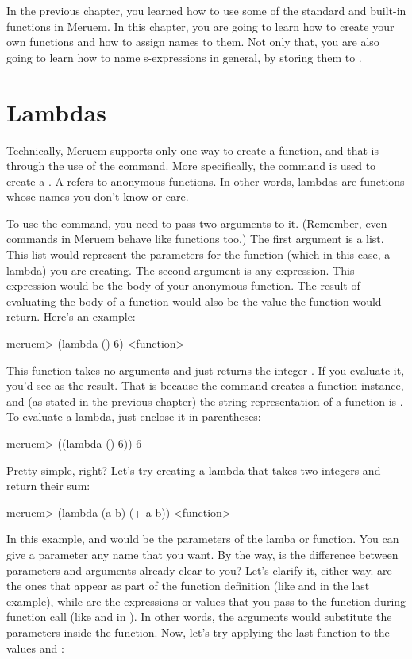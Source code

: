In the previous chapter, you learned how to use some of the standard and built-in functions in Meruem. In this chapter, you are going to learn how to create your own functions and how to assign names to them. Not only that, you are also going to learn how to name s-expressions in general, by storing them to .

\section{Lambdas}
Technically, Meruem supports only one way to create a function, and that is through the use of the  command. More specifically, the  command is used to create a . A  refers to anonymous functions. In other words, lambdas are functions whose names you don't know or care. 

To use the  command, you need to pass two arguments to it. (Remember, even commands in Meruem behave like functions too.) The first argument is a list. This list would represent the parameters for the function (which in this case, a lambda) you are creating. The second argument is any expression. This expression would be the body of your anonymous function. The result of evaluating the body of a function would also be the value the function would return. Here's an example:

\begin{REPL}
meruem> (lambda () 6)
<function>
\end{REPL}

This function takes no arguments and just returns the integer . If you evaluate it, you'd see  as the result. That is because the  command creates a function instance, and (as stated in the previous chapter) the string representation of a function is . To evaluate a lambda, just enclose it in parentheses:

\begin{REPL}
meruem> ((lambda () 6))
6
\end{REPL}

Pretty simple, right? Let's try creating a lambda that takes two integers and return their sum:

\begin{REPL}
meruem> (lambda (a b) (+ a b)) 
<function>
\end{REPL}

In this example,  and  would be the parameters of the lamba or function. You can give a parameter any name that you want. By the way, is the difference between parameters and arguments already clear to you? Let's clarify it, either way.  are the ones that appear as part of the function definition (like  and  in the last example), while  are the expressions or values that you pass to the function during function call (like  and  in ). In other words, the arguments would substitute the parameters inside the function. Now, let's try applying the last function to the values  and :

